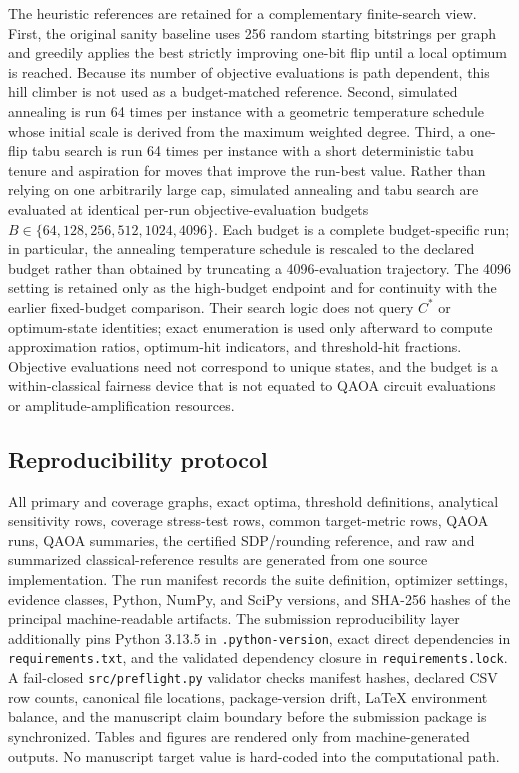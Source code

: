 \documentclass[5p,times]{elsarticle}
\begin{document}
The heuristic references are retained for a complementary finite-search view. First, the original sanity baseline uses 256 random starting bitstrings per graph and greedily applies the best strictly improving one-bit flip until a local optimum is reached. Because its number of objective evaluations is path dependent, this hill climber is not used as a budget-matched reference. Second, simulated annealing is run 64 times per instance with a geometric temperature schedule whose initial scale is derived from the maximum weighted degree. Third, a one-flip tabu search is run 64 times per instance with a short deterministic tabu tenure and aspiration for moves that improve the run-best value. Rather than relying on one arbitrarily large cap, simulated annealing and tabu search are evaluated at identical per-run objective-evaluation budgets $B\in\{64,128,256,512,1024,4096\}$. Each budget is a complete budget-specific run; in particular, the annealing temperature schedule is rescaled to the declared budget rather than obtained by truncating a 4096-evaluation trajectory. The 4096 setting is retained only as the high-budget endpoint and for continuity with the earlier fixed-budget comparison. Their search logic does not query $C^*$ or optimum-state identities; exact enumeration is used only afterward to compute approximation ratios, optimum-hit indicators, and threshold-hit fractions. Objective evaluations need not correspond to unique states, and the budget is a within-classical fairness device that is not equated to QAOA circuit evaluations or amplitude-amplification resources.

\subsection{Reproducibility protocol}
All primary and coverage graphs, exact optima, threshold definitions, analytical sensitivity rows, coverage stress-test rows, common target-metric rows, QAOA runs, QAOA summaries, the certified SDP/rounding reference, and raw and summarized classical-reference results are generated from one source implementation. The run manifest records the suite definition, optimizer settings, evidence classes, Python, NumPy, and SciPy versions, and SHA-256 hashes of the principal machine-readable artifacts. The submission reproducibility layer additionally pins Python 3.13.5 in \texttt{.python-version}, exact direct dependencies in \texttt{requirements.txt}, and the validated dependency closure in \texttt{requirements.lock}. A fail-closed \texttt{src/preflight.py} validator checks manifest hashes, declared CSV row counts, canonical file locations, package-version drift, LaTeX environment balance, and the manuscript claim boundary before the submission package is synchronized. Tables and figures are rendered only from machine-generated outputs. No manuscript target value is hard-coded into the computational path.
\end{document}
